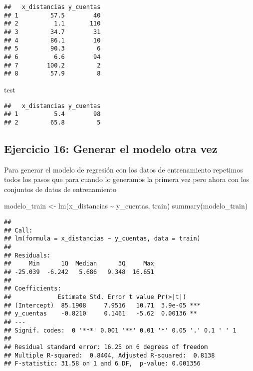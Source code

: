 \documentclass[
]{article}
\newenvironment{Shaded}{\begin{snugshade}}{\end{snugshade}}
\newcommand{\FunctionTok}[1]{\textcolor[rgb]{0.00,0.00,0.00}{#1}}
\newcommand{\NormalTok}[1]{#1}
\newcommand{\OtherTok}[1]{\textcolor[rgb]{0.56,0.35,0.01}{#1}}
\newcommand{\SpecialCharTok}[1]{\textcolor[rgb]{0.00,0.00,0.00}{#1}}
\begin{document}
\begin{verbatim}
##   x_distancias y_cuentas
## 1         57.5        40
## 2          1.1       110
## 3         34.7        31
## 4         86.1        10
## 5         90.3         6
## 6          6.6        94
## 7        100.2         2
## 8         57.9         8
\end{verbatim}

\begin{Shaded}
\begin{Highlighting}[]
\NormalTok{test}
\end{Highlighting}
\end{Shaded}

\begin{verbatim}
##   x_distancias y_cuentas
## 1          5.4        98
## 2         65.8         5
\end{verbatim}

\hypertarget{ejercicio-16-generar-el-modelo-otra-vez}{%
\subsection{Ejercicio 16: Generar el modelo otra
vez}\label{ejercicio-16-generar-el-modelo-otra-vez}}

Para generar el modelo de regresión con los datos de entrenamiento
repetimos todos los pasos que para cuando lo generamos la primera vez
pero ahora con los conjuntos de datos de entrenamiento

\begin{Shaded}
\begin{Highlighting}[]
\NormalTok{modelo\_train }\OtherTok{\textless{}{-}} \FunctionTok{lm}\NormalTok{(x\_distancias }\SpecialCharTok{\textasciitilde{}}\NormalTok{ y\_cuentas, train)}
\FunctionTok{summary}\NormalTok{(modelo\_train)}
\end{Highlighting}
\end{Shaded}

\begin{verbatim}
## 
## Call:
## lm(formula = x_distancias ~ y_cuentas, data = train)
## 
## Residuals:
##     Min      1Q  Median      3Q     Max 
## -25.039  -6.242   5.686   9.348  16.651 
## 
## Coefficients:
##             Estimate Std. Error t value Pr(>|t|)    
## (Intercept)  85.1908     7.9516   10.71  3.9e-05 ***
## y_cuentas    -0.8210     0.1461   -5.62  0.00136 ** 
## ---
## Signif. codes:  0 '***' 0.001 '**' 0.01 '*' 0.05 '.' 0.1 ' ' 1
## 
## Residual standard error: 16.25 on 6 degrees of freedom
## Multiple R-squared:  0.8404, Adjusted R-squared:  0.8138 
## F-statistic: 31.58 on 1 and 6 DF,  p-value: 0.001356
\end{verbatim}
\end{document}
